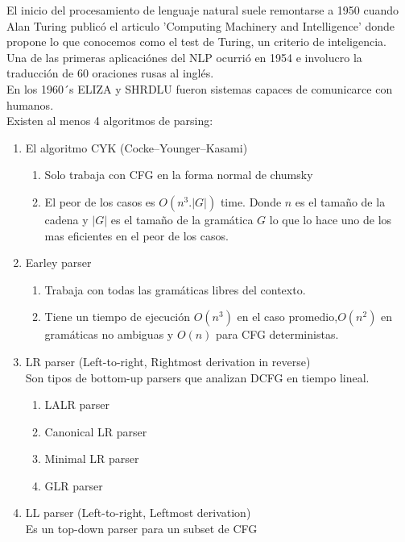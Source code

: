 El inicio del procesamiento de lenguaje natural suele remontarse a 1950 cuando Alan Turing publicó el articulo 'Computing Machinery and Intelligence' donde propone lo que conocemos como el test de Turing, un criterio de inteligencia.
\\
Una de las primeras aplicaciónes del NLP ocurrió en 1954 e involucro la traducción de 60 oraciones rusas al inglés.
\\
En los 1960´s ELIZA y SHRDLU fueron sistemas capaces de comunicarce con  humanos.
\\
Existen al menos 4 algoritmos de parsing:
\begin{enumerate}
    \item El algoritmo CYK (Cocke–Younger–Kasami)
    \begin{enumerate}
        \item Solo trabaja con CFG en la forma normal de chumsky
        \item El peor de los casos es $O(n^3 . |G|)$ time. Donde $n$ es el tamaño de la cadena y $|G|$ es el tamaño de la gramática $G$ lo que lo hace uno de los mas eficientes en el peor de los casos.
    \end{enumerate}
    \item Earley parser
    \begin{enumerate}
        \item Trabaja con todas las gramáticas libres del contexto.
        \item Tiene un tiempo de ejecución $O(n^3)$ en el caso promedio,$O(n^2)$ en gramáticas no ambiguas y $O(n)$ para CFG deterministas.
    \end{enumerate}
    \item LR parser (Left-to-right, Rightmost derivation in reverse)\\
    Son tipos de bottom-up parsers que analizan DCFG en tiempo lineal.
    \begin{enumerate}
        \item LALR parser
        \item Canonical LR parser
        \item Minimal LR parser 
        \item GLR parser
    \end{enumerate}
    
    \item LL parser (Left-to-right, Leftmost derivation)\\
    Es un top-down parser para un subset de CFG
\end{enumerate}